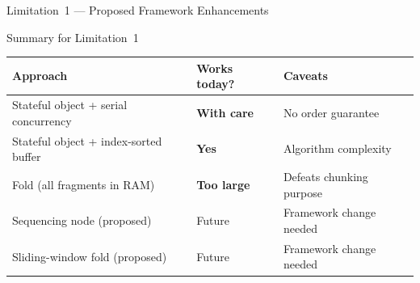 \documentclass[aspectratio=169,10pt]{beamer}
\newcommand{\good}[1]{\textcolor{green!50!black}{\textbf{#1}}}
\newcommand{\bad}[1]{\textcolor{red!70!black}{\textbf{#1}}}
\newcommand{\warn}[1]{\textcolor{orange!80!black}{\textbf{#1}}}
\begin{document}
\begin{frame}{Limitation~1 --- Proposed Framework Enhancements}
  \bigskip
  \begin{block}{Summary for Limitation~1}
    \small
    \begin{tabular}{@{}lll@{}}
      \toprule
      Approach & Works today? & Caveats \\
      \midrule
      Stateful object + serial concurrency & \warn{With care} & No order guarantee \\
      Stateful object + index-sorted buffer & \good{Yes} & Algorithm complexity \\
      Fold (all fragments in RAM) & \bad{Too large} & Defeats chunking purpose \\
      Sequencing node (proposed) & Future & Framework change needed \\
      Sliding-window fold (proposed) & Future & Framework change needed \\
      \bottomrule
    \end{tabular}
  \end{block}
\end{frame}

\end{document}

